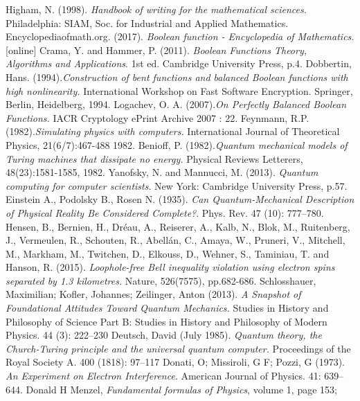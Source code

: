 \documentclass[12pt,a4paper,openright]{report}
\begin{document}
\begin{thebibliography}{40}
     Higham, N. (1998). \emph{Handbook of writing for the mathematical sciences.} Philadelphia: SIAM, Soc. for Industrial and Applied Mathematics.
     Encyclopediaofmath.org. (2017). \emph{Boolean function - Encyclopedia of Mathematics.} [online] 
     Crama, Y. and Hammer, P. (2011). \emph{Boolean Functions Theory, Algorithms and Applications}. 1st ed. Cambridge University Press, p.4.
     Dobbertin, Hans. (1994).\emph{Construction of bent functions and balanced Boolean functions with high nonlinearity.} International Workshop on Fast Software Encryption. Springer, Berlin, Heidelberg, 1994.
     Logachev, O. A. (2007).\emph{On Perfectly Balanced Boolean Functions.} IACR Cryptology ePrint Archive 2007 : 22.
     Feynmann, R.P. (1982).\emph{Simulating physics with computers.} International Journal of Theoretical Physics, 21(6/7):467-488 1982.
     Benioff, P. (1982).\emph{Quantum mechanical models of Turing machines that dissipate no energy.} Physical Reviews Letterers, 48(23):1581-1585, 1982.
     Yanofsky, N. and Mannucci, M. (2013). \emph{Quantum computing for computer scientists}. New York: Cambridge University Press, p.57.
     Einstein A., Podolsky B., Rosen N. (1935). \emph{Can Quantum-Mechanical Description of Physical Reality Be Considered Complete?}. Phys. Rev. 47 (10): 777–780. 
     Hensen, B., Bernien, H., Dréau, A., Reiserer, A., Kalb, N., Blok, M., Ruitenberg, J., Vermeulen, R., Schouten, R., Abellán, C., Amaya, W., Pruneri, V., Mitchell, M., Markham, M., Twitchen, D., Elkouss, D., Wehner, S., Taminiau, T. and Hanson, R. (2015). \emph{Loophole-free Bell inequality violation using electron spins separated by 1.3 kilometres.} Nature, 526(7575), pp.682-686.
     Schlosshauer, Maximilian; Kofler, Johannes; Zeilinger, Anton (2013). \emph{A Snapshot of Foundational Attitudes Toward Quantum Mechanics.} Studies in History and Philosophy of Science Part B: Studies in History and Philosophy of Modern Physics. 44 (3): 222–230
     Deutsch, David (July 1985). \emph{Quantum theory, the Church-Turing principle and the universal quantum computer.} Proceedings of the Royal Society A. 400 (1818): 97–117
     Donati, O; Missiroli, G F; Pozzi, G (1973). \emph{An Experiment on Electron Interference}. American Journal of Physics. 41: 639–644.
     Donald H Menzel, \emph{Fundamental formulas of Physics}, volume 1, page 153; 

\end{thebibliography}
\end{document}
